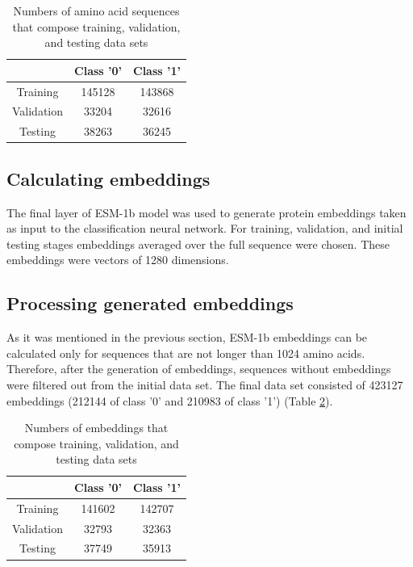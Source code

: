 \documentclass[12pt]{article}
\begin{document}
	\begin{table}[h!]
		\caption{Numbers of amino acid sequences that compose training, 
		validation, and testing data sets}
		\vspace{0.2cm}
		\centering
		\begin{tabular}{ | c c c | }
			\hline 
			& Class '0' & Class '1' \\
			\hline 
			Training & 145128 & 143868 \\
			Validation & 33204 & 32616 \\
			Testing & 38263 & 36245 \\
			\hline    
		\end{tabular}
		\label{table:sequences003}
	\end{table}

	\subsection{Calculating embeddings}

	The final layer of ESM-1b model was used to generate protein embeddings
	taken as input to the classification neural network. For training, validation,
	and initial testing stages embeddings averaged over the full sequence were
	chosen. These embeddings were vectors of 1280 dimensions.

	\subsection{Processing generated embeddings}

	As it was mentioned in the previous section, ESM-1b embeddings can be 
	calculated only for sequences that are not longer than 1024 amino acids.
	Therefore, after the generation of embeddings, sequences without embeddings 
	were filtered out from the initial data set. The final data set consisted
	of 423127 embeddings (212144 of class '0' and 210983 of class '1') (Table 
	\ref{table:embeddings003}).

	\begin{table}[h!]
		\caption{Numbers of embeddings that compose training, 
		validation, and testing data sets}
		\vspace{0.2cm}
		\centering
		\begin{tabular}{ | c c c | }
			\hline 
			& Class '0' & Class '1' \\
			\hline 
			Training & 141602 & 142707 \\
			Validation & 32793 & 32363 \\
			Testing & 37749 & 35913 \\
			\hline    
		\end{tabular}
		\label{table:embeddings003}
	\end{table}
\end{document}
